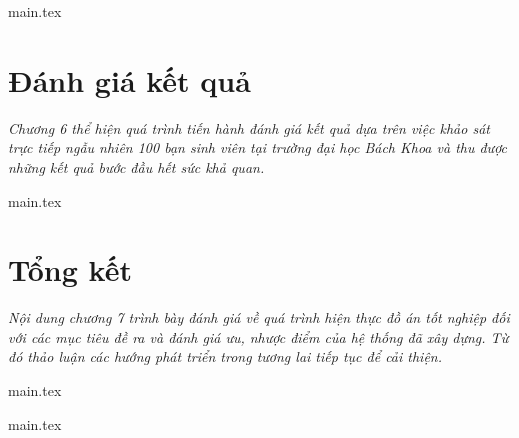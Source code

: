 \documentclass[a4paper, 12pt]{report}
\begin{document}
{main.tex}

\chapter{Đánh giá kết quả}\label{chap:chap6}
\thispagestyle{fancy} %

\textit{Chương 6 thể hiện quá trình tiến hành đánh giá kết quả dựa trên việc khảo sát trực tiếp ngẫu nhiên 100 bạn sinh viên tại trường đại học Bách Khoa và thu được những kết quả bước đầu hết sức khả quan.}

{main.tex}

\chapter{Tổng kết} \label{chap:summary}
\thispagestyle{fancy} %

\textit{Nội dung chương 7 trình bày đánh giá về quá trình hiện thực đồ án tốt nghiệp đối với các mục tiêu đề ra và đánh giá ưu, nhược điểm của hệ thống đã xây dựng. Từ đó thảo luận các hướng phát triển trong tương lai tiếp tục để cải thiện.}

{main.tex}

\newpage
\pagestyle{empty}

{main.tex}

\end{document}
